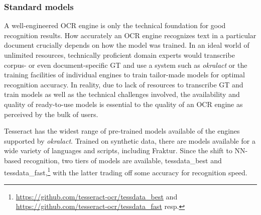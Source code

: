 \documentclass[sigconf]{acmart}
\begin{document}
\subsubsection{Standard models}
\label{sec:models}

A well-engineered OCR engine is only the technical foundation for
good recognition results. How accurately an OCR engine recognizes text
in a particular document crucially depends on how the model was trained. In
an ideal world of unlimited resources, technically proficient domain experts
would transcribe corpus- or even document-specific GT and use a system such as
\textit{okralact} or the training facilities of individual engines to train
tailor-made models for optimal recognition accuracy. In reality, due to lack of
resources to transcribe GT and train models as well as the technical
challenges involved, the availability and quality of ready-to-use models is 
essential to the quality of an OCR engine as perceived by the bulk of users.

Tesseract has the widest range of pre-trained models available of the engines
supported by \textit{okralact}. Trained on synthetic data, there are models available
for a wide variety of languages and scripts, including Fraktur. Since the shift
to NN-based recognition, two tiers of models are available, tessdata\_best and
tessdata\_fast,\footnote{\url{https://github.com/tesseract-ocr/tessdata_best} and \url{https://github.com/tesseract-ocr/tessdata_fast} resp.} with the latter trading off some accuracy for recognition speed.
\end{document}
